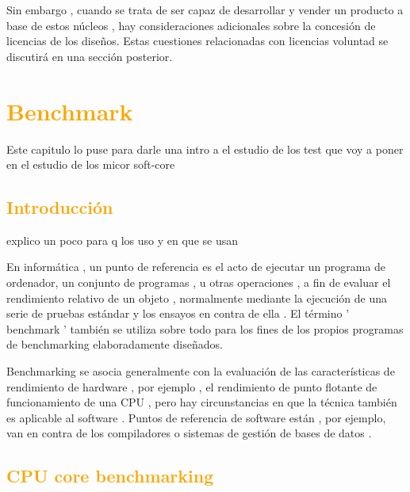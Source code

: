 \documentclass[a4paper,11pt]{article}
\begin{document}
 Sin embargo , cuando se trata de ser capaz de desarrollar y vender un producto a base de estos núcleos , hay consideraciones adicionales sobre la concesión de licencias de los diseños. Estas cuestiones relacionadas con licencias voluntad se discutirá en una sección posterior.



\section{\textcolor{orange}{Benchmark}}
Este capitulo lo puse para darle una intro a el estudio de los test que voy a poner en el estudio de los micor soft-core
	\subsection{\textcolor{orange}{Introducción}}
explico un poco para q los uso y en que se usan

En informática , un punto de referencia es el acto de ejecutar un programa de ordenador, un conjunto de programas , u otras operaciones , a fin de evaluar el rendimiento relativo de un objeto , normalmente mediante la ejecución de una serie de pruebas estándar y los ensayos en contra de ella . El término ' benchmark ' también se utiliza sobre todo para los fines de los propios programas de benchmarking elaboradamente diseñados.

Benchmarking se asocia generalmente con la evaluación de las características de rendimiento de hardware , por ejemplo , el rendimiento de punto flotante de funcionamiento de una CPU , pero hay circunstancias en que la técnica también es aplicable al software . Puntos de referencia de software están , por ejemplo, van en contra de los compiladores o sistemas de gestión de bases de datos .

	\subsection{\textcolor{orange}{CPU core benchmarking}}
 
\end{document}
